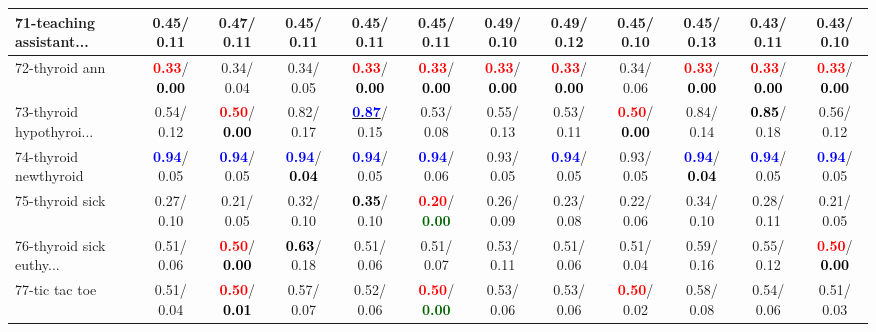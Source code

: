 \begin{table}[h]
\begin{center}
{\begin{tabular}{lc|c|c|c|c|c|c|c|c|c|c}
71-teaching assistant... &   0.45/  0.11 &   0.47/  0.11 &   0.45/  0.11 &   0.45/  0.11 &   0.45/  0.11 &   0.49/  0.10 &   0.49/  0.12 &   0.45/  0.10 &   0.45/  0.13 &   0.43/  0.11 &   0.43/  0.10 \\ \hline
72-thyroid ann & \textcolor{red}{\textbf{  0.33}}/\textcolor{black}{\textbf{  0.00}} &   0.34/  0.04 &   0.34/  0.05 & \textcolor{red}{\textbf{  0.33}}/\textcolor{black}{\textbf{  0.00}} & \textcolor{red}{\textbf{  0.33}}/\textcolor{black}{\textbf{  0.00}} & \textcolor{red}{\textbf{  0.33}}/\textcolor{black}{\textbf{  0.00}} & \textcolor{red}{\textbf{  0.33}}/\textcolor{black}{\textbf{  0.00}} &   0.34/  0.06 & \textcolor{red}{\textbf{  0.33}}/\textcolor{black}{\textbf{  0.00}} & \textcolor{red}{\textbf{  0.33}}/\textcolor{black}{\textbf{  0.00}} & \textcolor{red}{\textbf{  0.33}}/\textcolor{black}{\textbf{  0.00}} \\
73-thyroid hypothyroi... &   0.54/  0.12 & \textcolor{red}{\textbf{  0.50}}/\textcolor{black}{\textbf{  0.00}} &   0.82/  0.17 & \underline{\textcolor{blue}{\textbf{  0.87}}}/  0.15 &   0.53/  0.08 &   0.55/  0.13 &   0.53/  0.11 & \textcolor{red}{\textbf{  0.50}}/\textcolor{black}{\textbf{  0.00}} &   0.84/  0.14 & \textcolor{black}{\textbf{  0.85}}/  0.18 &   0.56/  0.12 \\
74-thyroid newthyroid & \textcolor{blue}{\textbf{  0.94}}/  0.05 & \textcolor{blue}{\textbf{  0.94}}/  0.05 & \textcolor{blue}{\textbf{  0.94}}/\textcolor{black}{\textbf{  0.04}} & \textcolor{blue}{\textbf{  0.94}}/  0.05 & \textcolor{blue}{\textbf{  0.94}}/  0.06 &   0.93/  0.05 & \textcolor{blue}{\textbf{  0.94}}/  0.05 &   0.93/  0.05 & \textcolor{blue}{\textbf{  0.94}}/\textcolor{black}{\textbf{  0.04}} & \textcolor{blue}{\textbf{  0.94}}/  0.05 & \textcolor{blue}{\textbf{  0.94}}/  0.05 \\
75-thyroid sick &   0.27/  0.10 &   0.21/  0.05 &   0.32/  0.10 & \textcolor{black}{\textbf{  0.35}}/  0.10 & \textcolor{red}{\textbf{  0.20}}/\textcolor{darkgreen}{\textbf{  0.00}} &   0.26/  0.09 &   0.23/  0.08 &   0.22/  0.06 &   0.34/  0.10 &   0.28/  0.11 &   0.21/  0.05 \\
76-thyroid sick euthy... &   0.51/  0.06 & \textcolor{red}{\textbf{  0.50}}/\textcolor{black}{\textbf{  0.00}} & \textcolor{black}{\textbf{  0.63}}/  0.18 &   0.51/  0.06 &   0.51/  0.07 &   0.53/  0.11 &   0.51/  0.06 &   0.51/  0.04 &   0.59/  0.16 &   0.55/  0.12 & \textcolor{red}{\textbf{  0.50}}/\textcolor{black}{\textbf{  0.00}} \\
77-tic tac toe &   0.51/  0.04 & \textcolor{red}{\textbf{  0.50}}/\textcolor{black}{\textbf{  0.01}} &   0.57/  0.07 &   0.52/  0.06 & \textcolor{red}{\textbf{  0.50}}/\textcolor{darkgreen}{\textbf{  0.00}} &   0.53/  0.06 &   0.53/  0.06 & \textcolor{red}{\textbf{  0.50}}/  0.02 &   0.58/  0.08 &   0.54/  0.06 &   0.51/  0.03 \\

\end{tabular}}
\end{center}
\end{table}
